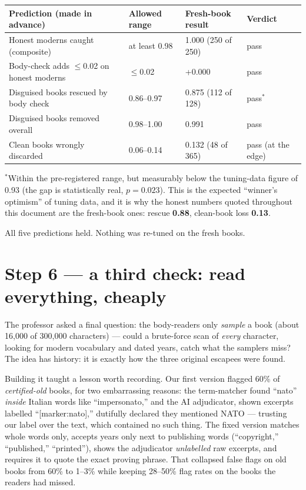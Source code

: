 \documentclass[11pt]{article}
\begin{document}
\begin{center}\small
\begin{tabular}{@{}llll@{}}
\toprule
\textbf{Prediction (made in advance)} & \textbf{Allowed range} & \textbf{Fresh-book result} & \textbf{Verdict}\\
\midrule
Honest moderns caught (composite) & at least 0.98 & 1.000 (250 of 250) & pass\\
Body-check adds $\le$0.02 on honest moderns & $\le$0.02 & +0.000 & pass\\
Disguised books rescued by body check & 0.86--0.97 & 0.875 (112 of 128) & pass$^{*}$\\
Disguised books removed overall & 0.98--1.00 & 0.991 & pass\\
Clean books wrongly discarded & 0.06--0.14 & 0.132 (48 of 365) & pass (at the edge)\\
\bottomrule
\end{tabular}
\end{center}

{\small $^{*}$Within the pre-registered range, but measurably below the tuning-data figure of 0.93
(the gap is statistically real, $p=0.023$). This is the expected ``winner's optimism'' of tuning data,
and it is why the honest numbers quoted throughout this document are the fresh-book ones: rescue
\textbf{0.88}, clean-book loss \textbf{0.13}.}

All five predictions held. Nothing was re-tuned on the fresh books.

\section{Step 6 --- a third check: read everything, cheaply}
The professor asked a final question: the body-readers only \emph{sample} a book (about 16{,}000 of
300{,}000 characters) --- could a brute-force scan of \emph{every} character, looking for modern
vocabulary and dated years, catch what the samplers miss? The idea has history: it is exactly how the
three original escapees were found.

Building it taught a lesson worth recording. Our first version flagged 60\% of \emph{certified-old}
books, for two embarrassing reasons: the term-matcher found ``nato'' \emph{inside} Italian words like
``impersonato,'' and the AI adjudicator, shown excerpts labelled ``[marker:nato],'' dutifully declared
they mentioned NATO --- trusting our label over the text, which contained no such thing. The fixed
version matches whole words only, accepts years only next to publishing words (``copyright,''
``published,'' ``printed''), shows the adjudicator \emph{unlabelled} raw excerpts, and requires it to
quote the exact proving phrase. That collapsed false flags on old books from 60\% to 1--3\% while
keeping 28--50\% flag rates on the books the readers had missed.
\end{document}
